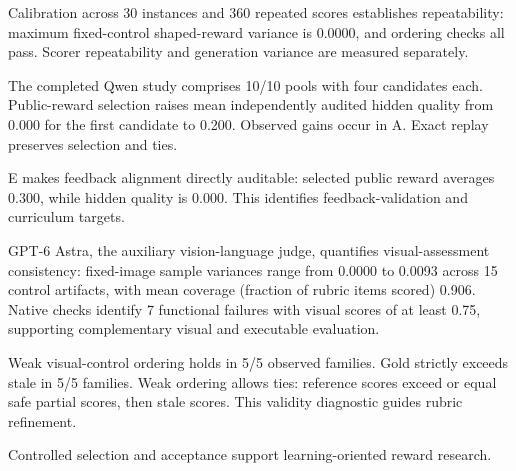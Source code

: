 Calibration across 30 instances and 360 repeated scores establishes repeatability: maximum fixed-control shaped-reward variance is 0.0000, and ordering checks all pass. Scorer repeatability and generation variance are measured separately.

The completed Qwen study comprises 10/10 pools with four candidates each. Public-reward selection raises mean independently audited hidden quality from 0.000 for the first candidate to 0.200. Observed gains occur in A. Exact replay preserves selection and ties.

E makes feedback alignment directly auditable: selected public reward averages 0.300, while hidden quality is 0.000. This identifies feedback-validation and curriculum targets.

GPT-6 Astra, the auxiliary vision-language judge, quantifies visual-assessment consistency: fixed-image sample variances range from 0.0000 to 0.0093 across 15 control artifacts, with mean coverage (fraction of rubric items scored) 0.906. Native checks identify 7 functional failures with visual scores of at least 0.75, supporting complementary visual and executable evaluation.

Weak visual-control ordering holds in 5/5 observed families. Gold strictly exceeds stale in 5/5 families. Weak ordering allows ties: reference scores exceed or equal safe partial scores, then stale scores. This validity diagnostic guides rubric refinement.

Controlled selection and acceptance support learning-oriented reward research.
